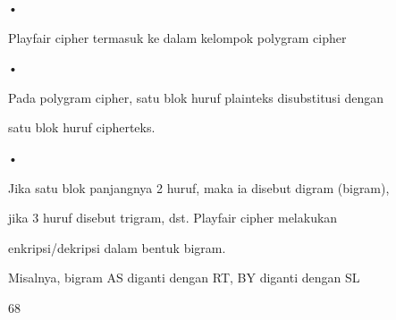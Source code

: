\documentclass{article}
\begin{document}

•

Playfair cipher termasuk ke dalam kelompok polygram cipher 

•

Pada polygram cipher, satu blok huruf plainteks disubstitusi dengan 

satu blok huruf cipherteks. 

•

Jika satu blok panjangnya 2 huruf, maka ia disebut digram (bigram), 

jika 3 huruf disebut trigram, dst. Playfair cipher melakukan 

enkripsi/dekripsi dalam bentuk bigram.

      Misalnya, bigram  AS diganti dengan RT, BY diganti dengan SL 

68
\end{document}

